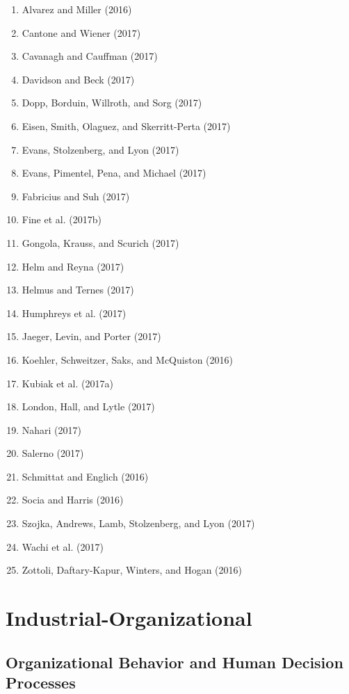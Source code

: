 \documentclass[english,man]{apa6}
\providecommand{\tightlist}{%
  \setlength{\itemsep}{0pt}\setlength{\parskip}{0pt}}
\begin{document}
\begin{enumerate}
\def\labelenumi{\arabic{enumi})}
\tightlist
\item
  Alvarez and Miller (2016)
\item
  Cantone and Wiener (2017)
\item
  Cavanagh and Cauffman (2017)
\item
  Davidson and Beck (2017)
\item
  Dopp, Borduin, Willroth, and Sorg (2017)
\item
  Eisen, Smith, Olaguez, and Skerritt-Perta (2017)
\item
  Evans, Stolzenberg, and Lyon (2017)
\item
  Evans, Pimentel, Pena, and Michael (2017)
\item
  Fabricius and Suh (2017)
\item
  Fine et al. (2017b)
\item
  Gongola, Krauss, and Scurich (2017)
\item
  Helm and Reyna (2017)
\item
  Helmus and Ternes (2017)
\item
  Humphreys et al. (2017)
\item
  Jaeger, Levin, and Porter (2017)
\item
  Koehler, Schweitzer, Saks, and McQuiston (2016)
\item
  Kubiak et al. (2017a)
\item
  London, Hall, and Lytle (2017)
\item
  Nahari (2017)
\item
  Salerno (2017)
\item
  Schmittat and Englich (2016)
\item
  Socia and Harris (2016)
\item
  Szojka, Andrews, Lamb, Stolzenberg, and Lyon (2017)
\item
  Wachi et al. (2017)
\item
  Zottoli, Daftary-Kapur, Winters, and Hogan (2016)
\end{enumerate}

\section{Industrial-Organizational}\label{industrial-organizational}

\subsection{Organizational Behavior and Human Decision
Processes}\label{organizational-behavior-and-human-decision-processes}
\end{document}
